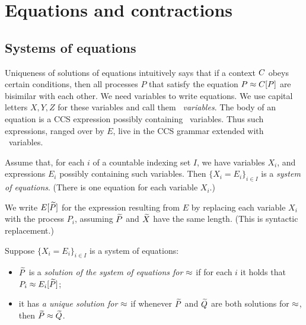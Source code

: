 \section{Equations and contractions}
\label{s:eq}

\subsection{Systems of  equations}
\label{ss:SysEq}

Uniqueness of  solutions of equations \cite{Mil89} intuitively says that if  a context $C$ obeys
certain  conditions, 
then all processes $P$  that satisfy the equation $ P \approx C [P]$ are
bisimilar with each other.
We need variables to write equations. We  use
 capital
letters  $X,Y,Z$
 for  these variables and call them \emph{\behav\  variables}.
 The body of an equation is a CCS expression
possibly containing \behav\  variables. Thus such expressions, ranged
over by $E$, live in the CCS
grammar extended with \behav\  variables.

  
\begin{definition} %
Assume that, for each $i$ of 
 a countable indexing set $I$, we have variables $X_i$, and expressions
$E_i$ possibly containing  such variables. 
Then 
$\{  X_i = E_i\}_{i\in I}$
is 
  a \emph{system of equations}. (There is one equation for each variable $X_i$.)
\end{definition}

We write $E[\widetilde P]$ for the expression resulting from $E$ by
replacing each variable $X_i$   with the process $P_i$, assuming
$\widetilde P$ and $\widetilde X$ have the same length. (This is syntactic
replacement.) 
\begin{definition}
Suppose  $\{  X_i = E_i\}_{i\in I}$ is a system of equations: 
\begin{itemize}
\item
 $\widetilde P$ is a \emph{solution of the 
system of equations  for $\approx$} 
if for each $i$ it holds
that $P_i \approx E_i [\widetilde P]$;

\item it %
 has \emph{a unique solution for $\approx$}  if whenever 
 $\widetilde P$ and $\widetilde Q$ are both solutions for $\approx$, then $\widetilde P \approx
 \widetilde Q$. 
\end{itemize} 
 \end{definition} 

